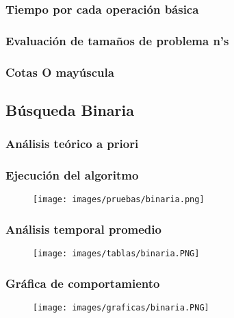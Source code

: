 \documentclass[12pt]{article}
\begin{document}
			\subsubsection{Tiempo por cada operación básica}
			
			\subsubsection{Evaluación de tamaños de problema n's}
			
			\subsubsection{Cotas O mayúscula}
			
\newpage

	
		\subsection{Búsqueda Binaria}
			
			\subsubsection{Análisis teórico a priori}
			
			\subsubsection{Ejecución del algoritmo}
				\begin{figure}[H]
			    	   \centering
			    	   \texttt{[image: images/pruebas/binaria.png]}
			    \end{figure}
			
			\subsubsection{Análisis temporal promedio}
				\begin{figure}[H]
			    	   \centering
			    	   \texttt{[image: images/tablas/binaria.PNG]}
			    \end{figure}
			
			\subsubsection{Gráfica de comportamiento}
				\begin{figure}[H]
			    	   \centering
			    	   \texttt{[image: images/graficas/binaria.PNG]}
			    \end{figure}
			
\end{document}
